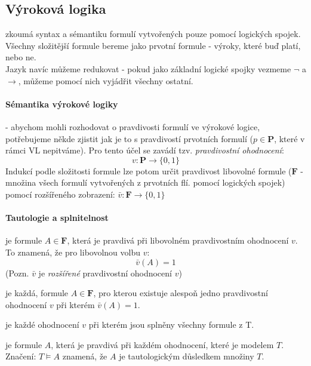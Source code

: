 \documentclass[a4paper]{article}      %
\newenvironment{definition}[1][Definice]{\begin{trivlist}
\item[\hskip \labelsep {\bfseries #1}]}{\end{trivlist}}
\begin{document}
\subsection{Výroková logika} zkoumá syntax a sémantiku formulí vytvořených pouze pomocí logických spojek.
Všechny složitější formule bereme jako prvotní formule - výroky, které buď platí, nebo ne.\\
Jazyk navíc můžeme redukovat - pokud jako základní logické spojky vezmeme $\neg$ a $\rightarrow$, můžeme pomocí nich vyjádřit všechny ostatní.

\paragraph{Sémantika výrokové logiky} - abychom mohli rozhodovat o pravdivosti formulí ve výrokové logice, potřebujeme někde zjistit
jak je to s pravdivostí prvotních formulí ($p \in \mathbf{P}$, které v rámci VL nepitváme).
Pro tento účel se zavádí tzv. \emph{pravdivostní ohodnocení}:
\[
v: \mathbf{P} \rightarrow \lbrace 0,1 \rbrace
\]
Indukcí podle složitosti formule lze potom určit pravdivost libovolné formule ($\mathbf{F}$ - množina všech formulí vytvořených z prvotních flí. pomocí logických spojek) pomocí rozšířeného zobrazení:
$\bar{v}: \mathbf{F} \rightarrow \lbrace 0,1 \rbrace$

\paragraph{Tautologie a splnitelnost}

\begin{definition}[Tautologie] je formule $A \in \mathbf{F}$, která je pravdivá při libovolném pravdivostním ohodnocení $v$. To znamená, že pro libovolnou volbu $v$:
\[
\bar{v}(A) = 1
\]
(Pozn. $\bar{v}$ je \emph{rozšířené} pravdivostní ohodnocení $v$)
\end{definition}

\begin{definition}[Splnitelná formule] je každá, formule $A \in \mathbf{F}$, pro kterou existuje alespoň jedno pravdivostní ohodnocení $v$
při kterém $\bar{v}(A) = 1$.
\end{definition}

\begin{definition}[Model množiny formulí T] je každé ohodnocení $v$ při kterém jsou splněny všechny formule z T.
\end{definition}

\begin{definition}[Tautologický důsledek množiny formulí T] je formule $A$, která je pravdivá při každém ohodnocení, které je modelem $T$.
Značení: $T \models A$ znamená, že $A$ je tautologickým důsledkem množiny $T$.
\end{definition}
\end{document}
